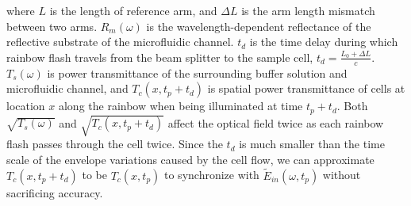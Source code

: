 \documentclass[aps,pra,reprint,superscriptaddress]{revtex4-1}
\begin{document}
where $L$ is the length of reference arm, and $\Delta L$ is the arm length mismatch between two arms. $R_m(\omega)$ is the wavelength-dependent reflectance of the reflective substrate of the microfluidic channel. $t_d$ is the time delay during which rainbow flash travels from the beam splitter to the sample cell, $t_d = \frac{L_0 + \Delta L}{c}$. $T_s(\omega)$ is power transmittance of the surrounding buffer solution and microfluidic channel, and $T_c(x,t_p + t_d)$ is spatial power transmittance of cells at location $x$ along the rainbow when being illuminated at time $t_p + t_d$. Both $\sqrt{T_s(\omega)}$ and $\sqrt{T_c(x,t_p + t_d)}$ affect the optical field twice as each rainbow flash passes through the cell twice. Since the $t_d$ is much smaller than the time scale of the envelope variations caused by the cell flow, we can approximate $T_c(x,t_p + t_d)$ to be $T_c(x,t_p)$ to synchronize with $\tilde{E}_{in}(\omega, t_p)$ without sacrificing accuracy.
\end{document}
